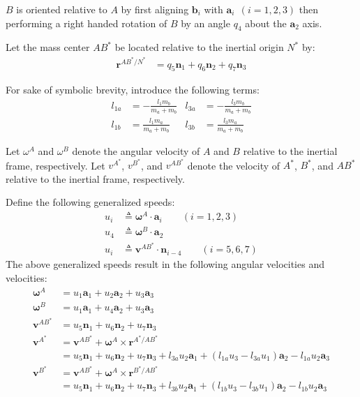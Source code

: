 \documentclass[letterpaper,11pt]{article}
\newcommand{\bs}[1]{ \boldsymbol{ #1 } }
\begin{document}
$B$ is oriented relative to $A$ by first aligning $\bs{b}_i$ with $\bs{a}_i
\:\: (i = 1,2,3)$ then performing a right handed rotation of $B$ by an angle
$q_4$ about the $\bs{a}_2$ axis.

Let the mass center $AB^*$ be located relative to the inertial origin $N^*$ by:
\begin{align*}
  \bs{r}^{AB^*/N^*} & = q_5 \bs{n}_1 + q_6 \bs{n}_2 + q_7 \bs{n}_3
\end{align*}

For sake of symbolic brevity, introduce the following terms:
\begin{align*}
  l_{1a} & = -\frac{l_1 m_b}{m_a + m_b} &
  l_{3a} & = -\frac{l_3 m_b}{m_a + m_b} \\
  l_{1b} & = \frac{l_1 m_a}{m_a + m_b} &
  l_{3b} & = \frac{l_3 m_a}{m_a + m_b}
\end{align*}

Let $\omega^A$ and $\omega^B$ denote the angular velocity of $A$ and $B$
relative to the inertial frame, respectively.  Let $v^{A^*}$, $v^{B^*}$, and $v^{AB^*}$ denote the
velocity of $A^*$, $B^*$, and $AB^*$ relative to the inertial frame,
respectively.

Define the following generalized speeds:
\begin{align}
  u_i & \triangleq \bs{\omega}^A \cdot \bs{a}_i  \qquad  (i = 1,2,3)
  \label{u_defs1} \\
  u_4 & \triangleq \bs{\omega}^B \cdot \bs{a}_2 \label{u_defs2} \\
  u_i & \triangleq \bs{v}^{AB^*} \cdot \bs{n}_{i-4} \qquad  (i = 5,6,7)
  \label{u_defs3}
\end{align}
The above generalized speeds result in the following angular velocities and
velocities:
\begin{align*}
  \bs{\omega}^A & = u_1 \bs{a}_1 + u_2 \bs{a}_2 + u_3 \bs{a}_3 \\
  \bs{\omega}^B & = u_1 \bs{a}_1 + u_4 \bs{a}_2 + u_3 \bs{a}_3 \\
  \bs{v}^{AB^*} & = u_5 \bs{n}_1 + u_6 \bs{n}_2 + u_7 \bs{n}_3 \\
  \bs{v}^{A^*}  & = \bs{v}^{AB^*} + \bs{\omega}^A \times \bs{r}^{A^*/AB^*} \\
  & = u_5 \bs{n}_1 + u_6 \bs{n}_2 + u_7 \bs{n}_3 +l_{3a}u_2\bs{a}_1 +
  (l_{1a}u_3 - l_{3a}u_1)\bs{a}_2 - l_{1a}u_2\bs{a}_3 \\
  \bs{v}^{B^*}  & = \bs{v}^{AB^*} + \bs{\omega}^A \times \bs{r}^{B^*/AB^*} \\
  & = u_5 \bs{n}_1 + u_6 \bs{n}_2 + u_7 \bs{n}_3 +l_{3b}u_2\bs{a}_1 +
  (l_{1b}u_3 - l_{3b}u_1)\bs{a}_2 - l_{1b}u_2\bs{a}_3
\end{align*}
\end{document}
